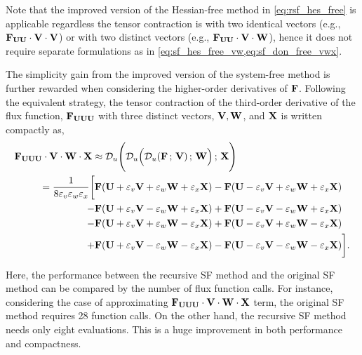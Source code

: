 Note that the improved version of the Hessian-free method in \cref{eq:rsf_hes_free}
is applicable regardless the tensor contraction is
with two identical vectors (e.g., \( \mathbf{F}_{\mathbf{U} \mathbf{U}} \cdot \mathbf{V} \cdot \mathbf{V} \))
or with two distinct vectors (e.g., \( \mathbf{F}_{\mathbf{U} \mathbf{U}} \cdot \mathbf{V} \cdot \mathbf{W} \)),
hence it does not require separate formulations as in
\cref{eq:sf_hes_free_vw,eq:sf_don_free_vwx}.

The simplicity gain from the improved version of the system-free method
is further rewarded when
considering the higher-order derivatives of \( \mathbf{F} \).
Following the equivalent strategy, the tensor contraction of
the third-order derivative of the flux function, \( \mathbf{F}_{\mathbf{U} \mathbf{U} \mathbf{U}} \)
with three distinct vectors, \( \mathbf{V}, \mathbf{W} \), and \( \mathbf{X} \) is written compactly as,
\begin{equation}\label{eq:rsf_don_free}
    \begin{split}
        \mathbf{F}_{\mathbf{U} \mathbf{U} \mathbf{U}} & \cdot \mathbf{V} \cdot \mathbf{W} \cdot \mathbf{X} \approx
        \mathcal{D}_{u} \Bigg( \mathcal{D}_{u} \Big( \mathcal{D}_{u} (\mathbf{F} \,;\, \mathbf{V}) \,;\, \mathbf{W} \Big) \,;\, \mathbf{X} \Bigg) \\
        &
        \begin{split}
            =\frac{1}{8 \varepsilon_{v} \varepsilon_{w} \varepsilon_{x}}
            \bigg[
                &\mathbf{F}(\mathbf{U} + \varepsilon_{v} \mathbf{V} + \varepsilon_{w} \mathbf{W} + \varepsilon_{x} \mathbf{X})
                -\mathbf{F}(\mathbf{U} - \varepsilon_{v} \mathbf{V} + \varepsilon_{w} \mathbf{W} + \varepsilon_{x} \mathbf{X})\\
                -&\mathbf{F}(\mathbf{U} + \varepsilon_{v} \mathbf{V} - \varepsilon_{w} \mathbf{W} + \varepsilon_{x} \mathbf{X})
                +\mathbf{F}(\mathbf{U} - \varepsilon_{v} \mathbf{V} - \varepsilon_{w} \mathbf{W} + \varepsilon_{x} \mathbf{X})\\
                -&\mathbf{F}(\mathbf{U} + \varepsilon_{v} \mathbf{V} + \varepsilon_{w} \mathbf{W} - \varepsilon_{x} \mathbf{X})
                +\mathbf{F}(\mathbf{U} - \varepsilon_{v} \mathbf{V} + \varepsilon_{w} \mathbf{W} - \varepsilon_{x} \mathbf{X})\\
                +&\mathbf{F}(\mathbf{U} + \varepsilon_{v} \mathbf{V} - \varepsilon_{w} \mathbf{W} - \varepsilon_{x} \mathbf{X})
                -\mathbf{F}(\mathbf{U} - \varepsilon_{v} \mathbf{V} - \varepsilon_{w} \mathbf{W} - \varepsilon_{x} \mathbf{X})
            \bigg].
        \end{split}
    \end{split}
\end{equation}

Here, the performance between the recursive SF method and the original SF method
can be compared by the number of flux function calls.
For instance, considering the case of approximating \( \mathbf{F}_{\mathbf{U}\mathbf{U}\mathbf{U}} \cdot \mathbf{V} \cdot \mathbf{W} \cdot \mathbf{X} \) term,
the original SF method requires 28 function calls.
On the other hand, the recursive SF method needs only eight evaluations.
This is a huge improvement in both performance and compactness. 


